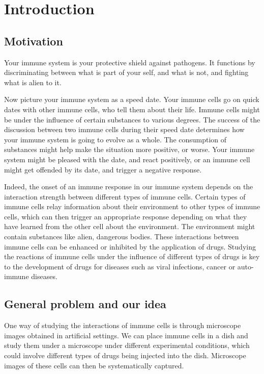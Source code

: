 \chapter{Introduction}

\section{Motivation}

Your immune system is your protective shield against pathogens. It functions by discriminating between what is part of your self, and what is not, and fighting what is alien to it.

Now picture your immune system as a speed date. Your immune cells go on quick dates with other immune cells, who tell them about their life. Immune cells might be under the influence of certain substances to various degrees. The success of the discussion between two immune cells during their speed date determines how your immune system is going to evolve as a whole. The consumption of substances might help make the situation more positive, or worse. Your immune system might be pleased with the date, and react positively, or an immune cell might get offended by its date, and trigger a negative response. %

Indeed, the onset of an immune response in our immune system depends on the interaction strength between different types of immune cells. Certain types of immune cells relay information about their environment to other types of immune cells, which can then trigger an appropriate response depending on what they have learned from the other cell about the environment. The environment might contain substances like alien, dangerous bodies. These interactions between immune cells can be enhanced or inhibited by the application of drugs. Studying the reactions of immune cells under the influence of different types of drugs is key to the development of drugs for diseases such as viral infections, cancer or auto-immune diseases. 

\section{General problem and our idea}

One way of studying the interactions of immune cells is through microscope images obtained in artificial settings. We can place immune cells in a dish and study them under a microscope under different experimental conditions, which could involve different types of drugs being injected into the dish. Microscope images of these cells can then be systematically captured.

